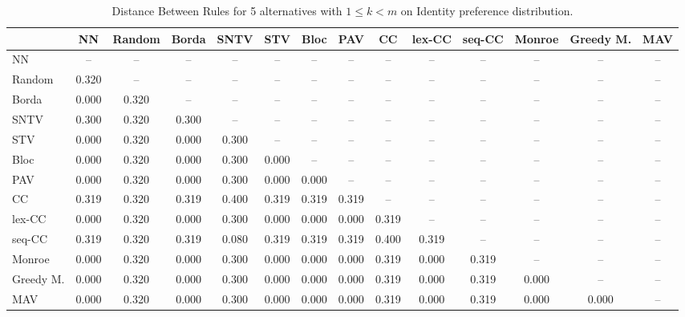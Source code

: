 
\begin{table*}
\centering
\begin{tabular}{lccccccccccccc}
\toprule
 & NN & Random & Borda & SNTV & STV & Bloc & PAV & CC & lex-CC & seq-CC & Monroe & Greedy M. & MAV \\
\midrule
NN & -- & -- & -- & -- & -- & -- & -- & -- & -- & -- & -- & -- & -- \\
Random & 0.320 & -- & -- & -- & -- & -- & -- & -- & -- & -- & -- & -- & -- \\
Borda & 0.000 & 0.320 & -- & -- & -- & -- & -- & -- & -- & -- & -- & -- & -- \\
SNTV & 0.300 & 0.320 & 0.300 & -- & -- & -- & -- & -- & -- & -- & -- & -- & -- \\
STV & 0.000 & 0.320 & 0.000 & 0.300 & -- & -- & -- & -- & -- & -- & -- & -- & -- \\
Bloc & 0.000 & 0.320 & 0.000 & 0.300 & 0.000 & -- & -- & -- & -- & -- & -- & -- & -- \\
PAV & 0.000 & 0.320 & 0.000 & 0.300 & 0.000 & 0.000 & -- & -- & -- & -- & -- & -- & -- \\
CC & 0.319 & 0.320 & 0.319 & 0.400 & 0.319 & 0.319 & 0.319 & -- & -- & -- & -- & -- & -- \\
lex-CC & 0.000 & 0.320 & 0.000 & 0.300 & 0.000 & 0.000 & 0.000 & 0.319 & -- & -- & -- & -- & -- \\
seq-CC & 0.319 & 0.320 & 0.319 & 0.080 & 0.319 & 0.319 & 0.319 & 0.400 & 0.319 & -- & -- & -- & -- \\
Monroe & 0.000 & 0.320 & 0.000 & 0.300 & 0.000 & 0.000 & 0.000 & 0.319 & 0.000 & 0.319 & -- & -- & -- \\
Greedy M. & 0.000 & 0.320 & 0.000 & 0.300 & 0.000 & 0.000 & 0.000 & 0.319 & 0.000 & 0.319 & 0.000 & -- & -- \\
MAV & 0.000 & 0.320 & 0.000 & 0.300 & 0.000 & 0.000 & 0.000 & 0.319 & 0.000 & 0.319 & 0.000 & 0.000 & -- \\
\bottomrule
\end{tabular}

\caption{Distance Between Rules for 5 alternatives with $1 \leq k < m$ on Identity preference distribution.}
\end{table*}
